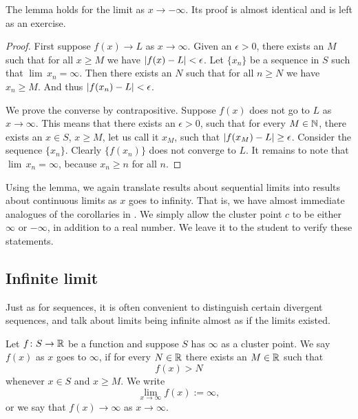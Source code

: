 The lemma holds for the limit as $x \to -\infty$.
Its proof is almost identical and
is left as an exercise.

\begin{proof}
First suppose $f(x) \to L$ as $x \to \infty$.
Given an $\epsilon > 0$, there exists an $M$ such that for all $x \geq M$
we have $\left\lvert {f(x)-L} \right\rvert < \epsilon$.
Let $\{ x_n \}$
be a sequence in $S$ such that $\lim \, x_n = \infty$.  Then there exists an
$N$ such that for all $n \geq N$ we have $x_n \geq M$.  And thus
$\left\lvert {f(x_n)-L} \right\rvert < \epsilon$.

We prove the converse by contrapositive.  Suppose $f(x)$ does
not go to $L$ as $x \to \infty$.
This means that there exists an $\epsilon > 0$,
such that for every $M \in {\mathbb{N}}$, there exists an $x \in S$, $x \geq M$, let
us call it $x_M$, such that $\left\lvert {f(x_M)-L} \right\rvert \geq \epsilon$.
Consider the sequence $\{ x_n \}$.  Clearly 
$\{ f(x_n) \}$ does not converge to $L$.  It remains to note
that $\lim\, x_n = \infty$, because $x_n \geq n$ for all $n$.
\end{proof}

Using the lemma, we again translate results about sequential
limits into results about continuous limits as $x$ goes to infinity.  That
is, we have almost immediate analogues of the corollaries
in .  We simply allow 
the cluster point $c$ to be either $\infty$ or $-\infty$, in addition
to a real number.  We leave it to
the student to verify these statements.

\subsection{Infinite limit}

Just as for sequences, it is often convenient to distinguish certain
divergent sequences, and talk about limits being infinite
almost as if the limits existed.

\begin{defn}
%
Let $f \colon S \to {\mathbb{R}}$ be a function and suppose 
$S$ has $\infty$ as a cluster point.
We say $f(x)$
\emph{} 
as $x$ goes to $\infty$,
if for every $N \in {\mathbb{R}}$
there exists an $M \in {\mathbb{R}}$ such that
\begin{equation*}
f(x) > N
\end{equation*}
whenever $x \in S$ and $x \geq M$.
We write
\begin{equation*}
\lim_{x \to \infty} f(x) := \infty ,
\end{equation*}
or we say that $f(x) \to \infty$ as $x \to \infty$.
\end{defn}

